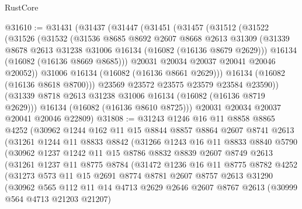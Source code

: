 \begin{lexlean}{RustCore}
\begin{coremodule}
@31610 := @31431
    (@31437
      (@31447
        (@31451
          (@31457
            (@31512
              (@31522
                (@31526
                  (@31532
                    (@31536
                      @8685
                      @8692
                      @2607
                      @8668
                      @2613
                      @31309
                      (@31339 @8678 @2613 @31238 @31006 @16134 (@16082 (@16136 @8679 @2629)))
                      @16134
                      (@16082 (@16136 @8669 @8685)))
                    @20031
                    @20034
                    @20037
                    @20041
                    @20046
                    @20052))
                @31006
                @16134
                (@16082 (@16136 @8661 @2629)))
              @16134
              (@16082 (@16136 @8618 @8700)))
            @23569
            @23572
            @23575
            @23579
            @23584
            @23590))
        (@31339 @8718 @2613 @31238 @31006 @16134 (@16082 (@16136 @8719 @2629)))
        @16134
        (@16082 (@16136 @8610 @8725)))
      @20031
      @20034
      @20037
      @20041
      @20046
      @22809)
@31808 := @31243
    @1246
    @16
    @11
    @8858
    @8865
    @4252
    (@30962
      @1244
      @162
      @11
      @15
      @8844
      @8857
      @8864
      @2607
      @8741
      @2613
      (@31261
        @1244
        @11
        @8833
        @8842
        (@31266
          @1243
          @16
          @11
          @8833
          @8840
          @5790
          (@30962
            @1237
            @1242
            @11
            @15
            @8786
            @8832
            @8839
            @2607
            @8749
            @2613
            (@31261
              @1237
              @11
              @8775
              @8784
              (@31472
                @1236
                @16
                @11
                @8775
                @8782
                @4252
                (@31273
                  @573
                  @11
                  @15
                  @2691
                  @8774
                  @8781
                  @2607
                  @8757
                  @2613
                  @31290
                  (@30962
                    @565
                    @112
                    @11
                    @14
                    @4713
                    @2629
                    @2646
                    @2607
                    @8767
                    @2613
                    (@30999 @564 @4713 @21203 @21207)

\end{coremodule}
\end{lexlean}

